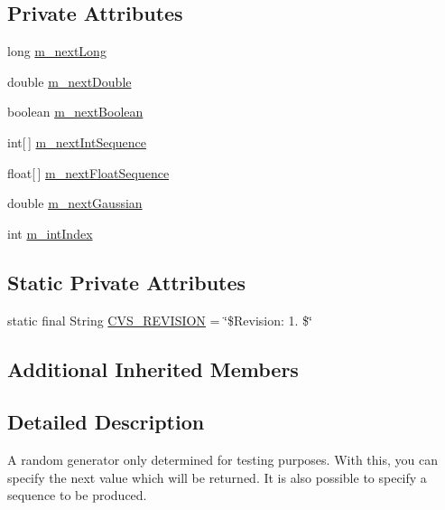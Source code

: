 \subsection*{Private Attributes}
\begin{DoxyCompactItemize}
\item 
long \hyperlink{classorg_1_1jgap_1_1impl_1_1_random_generator_for_testing_abd5fa434793c41fe1a54972e23e98428}{m\-\_\-next\-Long}
\item 
double \hyperlink{classorg_1_1jgap_1_1impl_1_1_random_generator_for_testing_a3a0e02c60b7315af43d765a4d7f2f1c5}{m\-\_\-next\-Double}
\item 
boolean \hyperlink{classorg_1_1jgap_1_1impl_1_1_random_generator_for_testing_a675749b4c353795c672a447b379a20d4}{m\-\_\-next\-Boolean}
\item 
int\mbox{[}$\,$\mbox{]} \hyperlink{classorg_1_1jgap_1_1impl_1_1_random_generator_for_testing_a2a4c3f020b7f7c46f6bba31cbbb9077c}{m\-\_\-next\-Int\-Sequence}
\item 
float\mbox{[}$\,$\mbox{]} \hyperlink{classorg_1_1jgap_1_1impl_1_1_random_generator_for_testing_a8c54f5bfae3acf8e14bd18f927555edf}{m\-\_\-next\-Float\-Sequence}
\item 
double \hyperlink{classorg_1_1jgap_1_1impl_1_1_random_generator_for_testing_af40fc81119968c042f9ea5b605f4e558}{m\-\_\-next\-Gaussian}
\item 
int \hyperlink{classorg_1_1jgap_1_1impl_1_1_random_generator_for_testing_a292525e2e439fecda21a97f392ea4294}{m\-\_\-int\-Index}
\end{DoxyCompactItemize}
\subsection*{Static Private Attributes}
\begin{DoxyCompactItemize}
\item 
static final String \hyperlink{classorg_1_1jgap_1_1impl_1_1_random_generator_for_testing_a87fb6bde08b6325c072ef3bbee30cd82}{C\-V\-S\-\_\-\-R\-E\-V\-I\-S\-I\-O\-N} = \char`\"{}\$Revision\-: 1. \$\char`\"{}
\end{DoxyCompactItemize}
\subsection*{Additional Inherited Members}


\subsection{Detailed Description}
A random generator only determined for testing purposes. With this, you can specify the next value which will be returned. It is also possible to specify a sequence to be produced.

